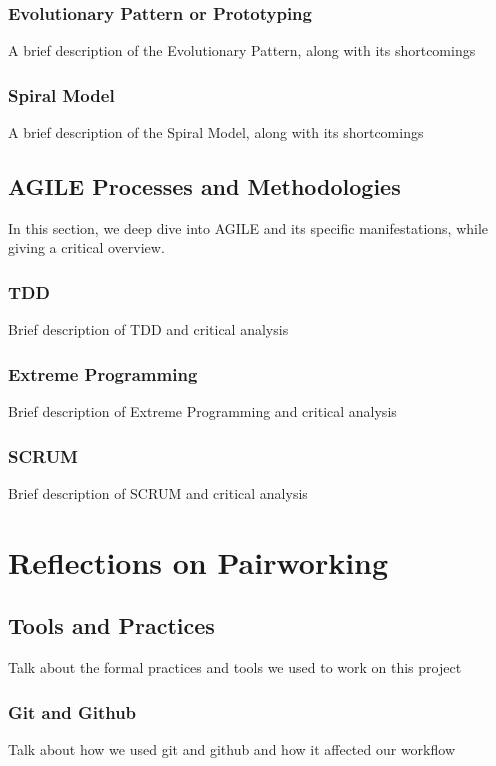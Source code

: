 \documentclass[11pt]{article}
\begin{document}
\subsubsection{Evolutionary Pattern or Prototyping}
A brief description of the Evolutionary Pattern, along with its shortcomings

\subsubsection{Spiral Model}
A brief description of the Spiral Model, along with its shortcomings

\subsection{AGILE Processes and Methodologies}
In this section, we deep dive into AGILE and its specific manifestations, while giving a critical overview.

\subsubsection{TDD}
Brief description of TDD and critical analysis

\subsubsection{Extreme Programming}
Brief description of Extreme Programming and critical analysis

\subsubsection{SCRUM}
Brief description of SCRUM and critical analysis

\section{Reflections on Pairworking}

\subsection{Tools and Practices}
Talk about the formal practices and tools we used to work on this project

\subsubsection{Git and Github}
Talk about how we used git and github and how it affected our workflow
\end{document}
